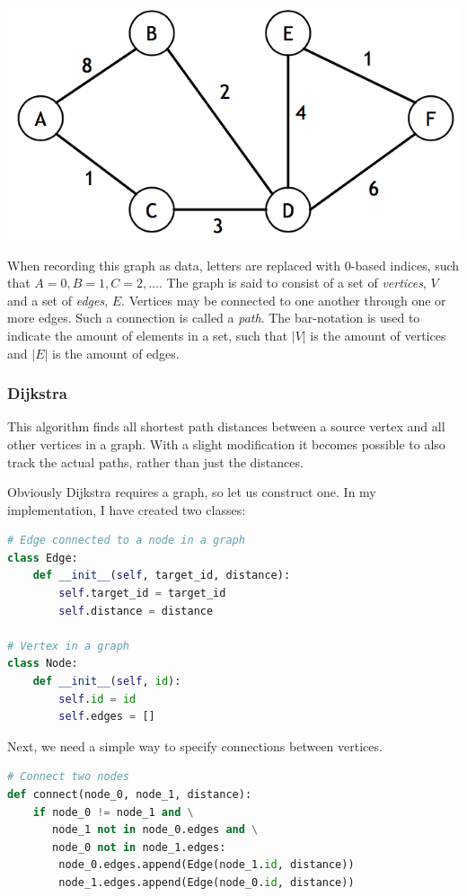 \documentclass{article}
\begin{document}
\includegraphics[width=\textwidth]{sample_graph}

When recording this graph as data, letters are replaced with 0-based indices, such that \(A=0, B=1, C=2, \dots\). The graph is said to consist of a set of {\em vertices}, \(V\) and a set of {\em edges}, \(E\). Vertices may be connected to one another through one or more edges. Such a connection is called a {\em path}.
The bar-notation is used to indicate the amount of elements in a set, such that \(|V|\) is the amount of vertices and \(|E|\) is the amount of edges.

\subsubsection{Dijkstra}
This algorithm finds all shortest path distances between a source vertex and all other vertices in a graph.
With a slight modification it becomes possible to also track the actual paths, rather than just the distances.

Obviously Dijkstra requires a graph, so let us construct one.
In my implementation, I have created two classes:

\begin{lstlisting}[language=Python]
# Edge connected to a node in a graph
class Edge:
    def __init__(self, target_id, distance):
        self.target_id = target_id
        self.distance = distance

# Vertex in a graph
class Node:
    def __init__(self, id):
        self.id = id
        self.edges = []
\end{lstlisting}

Next, we need a simple way to specify connections between vertices.

\begin{lstlisting}[language=Python]
# Connect two nodes
def connect(node_0, node_1, distance):
    if node_0 != node_1 and \
       node_1 not in node_0.edges and \
       node_0 not in node_1.edges:
        node_0.edges.append(Edge(node_1.id, distance))
        node_1.edges.append(Edge(node_0.id, distance))
\end{lstlisting}
\end{document}
